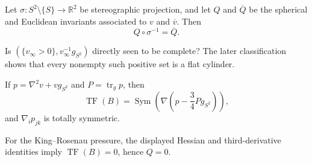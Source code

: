 \begin{lemma}
\label{lem:chow-iv-equivalence-q-euclidean-q}

Let \(\sigma:S^2\setminus\{S\}\to\mathbb R^2\) be stereographic
projection, and let \(Q\) and \(\overline Q\) be the spherical and Euclidean
invariants associated to \(v\) and \(\overline v\).  Then
\[
 Q\circ\sigma^{-1}=\overline Q.
\]
\end{lemma}

\begin{remark}
\label{rem:chow-iv-completeness-positive-pressure-set}
Is \((\{v_\infty>0\},v_\infty^{-1}g_{S^2})\) directly seen to be complete?
The later classification shows that every nonempty such positive set is a
flat cylinder.
\end{remark}

\begin{remark}
\label{rem:chow-iv-q-alternative-formula}
If \(p=\nabla^2v+vg_{S^2}\) and \(P=\operatorname{tr}_g p\), then
\[
 \operatorname{TF}(B)=
 \operatorname{Sym}\!\left(\nabla\left(p-\frac34Pg_{S^2}\right)\right),
\]
and \(\nabla_i p_{jk}\) is totally symmetric.
\end{remark}

\begin{remark}
\label{rem:chow-iv-q-vanishes-king-rosenau}
For the King--Rosenau pressure, the displayed Hessian and third-derivative
identities imply \(\operatorname{TF}(B)=0\), hence \(Q=0\).
\end{remark}
